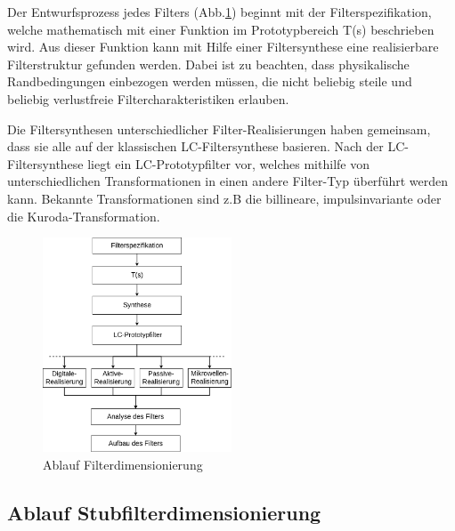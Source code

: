 Der Entwurfsprozess jedes Filters (Abb.\ref{fig:Ablauf_Filterdimensionierung}) beginnt mit der  Filterspezifikation, welche mathematisch mit einer Funktion im Prototypbereich T(s) beschrieben wird. Aus dieser Funktion kann mit Hilfe einer Filtersynthese eine realisierbare Filterstruktur gefunden werden. Dabei ist zu beachten, dass  physikalische Randbedingungen einbezogen werden müssen, die nicht beliebig steile und beliebig verlustfreie Filtercharakteristiken erlauben.

Die Filtersynthesen unterschiedlicher Filter-Realisierungen haben gemeinsam, dass sie alle auf der klassischen LC-Filtersynthese basieren. Nach der LC-Filtersynthese liegt ein LC-Prototypfilter vor, welches mithilfe von unterschiedlichen Transformationen in einen andere Filter-Typ überführt werden kann. Bekannte Transformationen sind z.B die billineare, impulsinvariante oder die Kuroda-Transformation.

\begin{figure}[h!]
\centering
 	\includegraphics[width=0.5\textwidth]{Ablauf_Filterdimensionierung_Allgemein.png}
 	\caption{Ablauf Filterdimensionierung}
 	\label{fig:Ablauf_Filterdimensionierung}
\end{figure}





\subsection{Ablauf Stubfilterdimensionierung}



